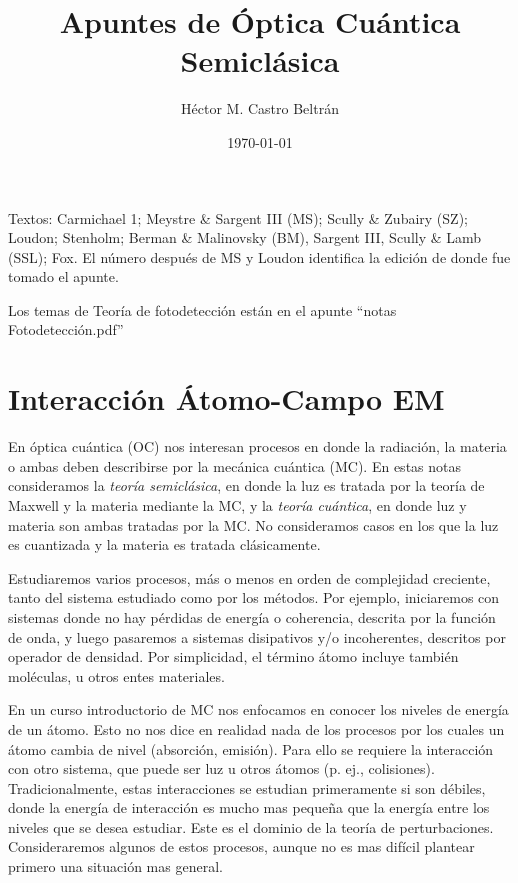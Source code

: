 \documentclass[twocolumn,aps,eqsecnum]{revtex4}
\begin{document}
\title{Apuntes de \'Optica Cu\'antica Semicl\'asica}
\author{H\'ector M. Castro Beltr\'an}
\date{\today}
\maketitle


Textos: Carmichael 1; Meystre \& Sargent III (MS); Scully \& Zubairy (SZ); 
Loudon; Stenholm; Berman \& Malinovsky (BM), Sargent III, Scully \& Lamb 
(SSL);  Fox. El n\'umero despu\'es de MS y Loudon identifica la edici\'on de 
 donde fue tomado el apunte. 

Los temas de Teor\'ia de fotodetecci\'on est\'an en el apunte 
``notas Fotodetecci\'on.pdf''


\section{Interacci\'on \'Atomo-Campo EM} 
En \'optica cu\'antica (OC) nos interesan procesos en donde la radiaci\'on, la 
materia o ambas deben describirse por la mec\'anica cu\'antica (MC). En estas 
notas consideramos la \textit{teor\'ia semicl\'asica}, en donde la luz es tratada 
por la teor\'ia de Maxwell y la materia mediante la MC, y la \textit{teor\'ia 
cu\'antica}, en donde luz y materia son ambas tratadas por la MC. No 
consideramos casos en los que la luz es cuantizada y la materia es tratada cl\'asicamente. 

Estudiaremos varios procesos, m\'as o menos en orden de complejidad 
creciente, tanto del sistema estudiado como por los m\'etodos. Por ejemplo, 
iniciaremos con sistemas donde no hay p\'erdidas de energ\'ia o coherencia, 
descrita por la funci\'on de onda, y luego pasaremos a sistemas disipativos 
y/o incoherentes, descritos por operador de densidad. Por simplicidad, el 
t\'ermino \'atomo incluye tambi\'en mol\'eculas, u otros entes materiales. 

En un curso introductorio de MC nos enfocamos en conocer los niveles de 
energ\'ia de un \'atomo. Esto no nos dice en realidad nada de los procesos 
por los cuales un \'atomo cambia de nivel (absorci\'on, emisi\'on). Para ello se 
requiere la interacci\'on con otro sistema, que puede ser luz u otros \'atomos 
(p. ej., colisiones). Tradicionalmente, estas interacciones se estudian 
primeramente si son d\'ebiles, donde la energ\'ia de interacci\'on es mucho 
mas peque\~na que la energ\'ia entre los niveles que se desea estudiar. Este 
es el dominio de la teor\'ia de perturbaciones. Consideraremos algunos de 
estos procesos, aunque no es mas dif\'icil plantear primero una situaci\'on mas 
general.  
\end{document}
